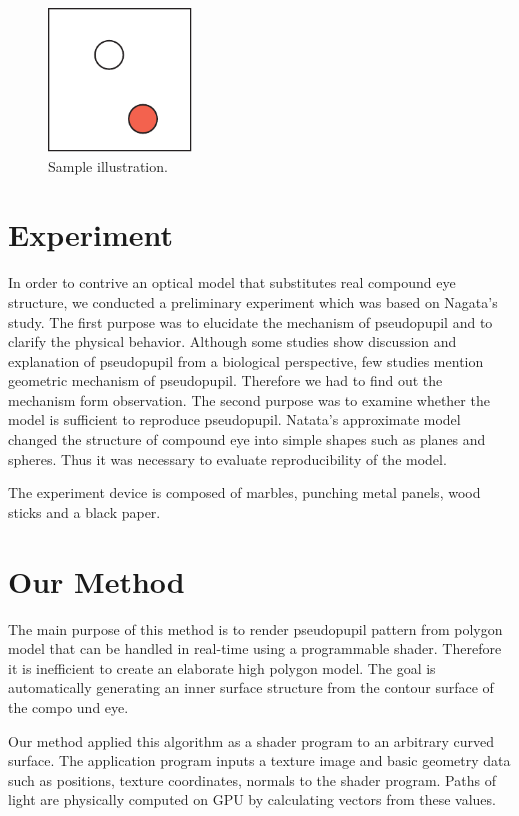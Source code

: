 \begin{figure}[ht]
  \centering
  \includegraphics[width=1.5in]{images/samplefigure}
  \caption{Sample illustration.}
\end{figure}


\section{Experiment}

In order to contrive an optical model that substitutes real compound eye structure, we conducted a preliminary experiment which was based on Nagata's study\cite{}.
The first purpose was to elucidate the mechanism of pseudopupil and to clarify the physical behavior.
Although some studies show discussion and explanation of pseudopupil from a biological perspective, few studies mention geometric mechanism of pseudopupil.
Therefore we had to find out the mechanism form observation.
The second purpose was to examine whether the model is sufficient to reproduce pseudopupil.
Natata's approximate model changed the structure of compound eye into simple shapes such as planes and spheres.
Thus it was necessary to evaluate reproducibility of the model.

The experiment device is composed of marbles, punching metal panels, wood sticks and a black paper.



\section{Our Method}

The main purpose of this method is to render pseudopupil pattern from polygon model that can be handled in real-time using a programmable shader. Therefore it is inefficient to create an elaborate high polygon model.
The goal is automatically generating an inner surface structure from the contour surface of the compo und eye. 

Our method applied this algorithm as a shader program to an arbitrary curved surface.
The application program inputs a texture image and basic geometry data such as positions, texture coordinates, normals to the shader program.
Paths of light are physically computed on GPU by calculating vectors from these values.

